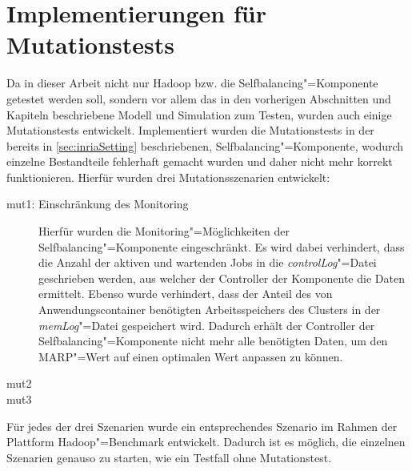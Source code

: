 \section{Implementierungen für Mutationstests}\label{sec:implMutationTests}

Da in dieser Arbeit nicht nur Hadoop bzw. die Selfbalancing"=Komponente getestet werden soll, sondern vor allem das in den vorherigen Abschnitten und Kapiteln beschriebene Modell und Simulation zum Testen, wurden auch einige Mutationstests entwickelt.
Implementiert wurden die Mutationstests in der bereits in \autoref{sec:inriaSetting} beschriebenen, Selfbalancing"=Komponente, wodurch einzelne Bestandteile fehlerhaft gemacht wurden und daher nicht mehr korrekt funktionieren.
Hierfür wurden drei Mutationsszenarien entwickelt:

\begin{description}
    \item [mut1: Einschränkung des Monitoring]
        Hierfür wurden die Monitoring"=Möglichkeiten der Selfbalancing"=Komponente eingeschränkt.
        Es wird dabei verhindert, dass die Anzahl der aktiven und wartenden Jobs in die \emph{controlLog}"=Datei geschrieben werden, aus welcher der Controller der Komponente die Daten ermittelt.
        Ebenso wurde verhindert, dass der Anteil des von Anwendungscontainer benötigten Arbeitsspeichers des Clusters in der \emph{memLog}"=Datei gespeichert wird.
        Dadurch erhält der Controller der Selfbalancing"=Komponente nicht mehr alle benötigten Daten, um den \ac{MARP}"=Wert auf einen optimalen Wert anpassen zu können.
    \item [mut2]
    \item [mut3]
\end{description}

Für jedes der drei Szenarien wurde ein entsprechendes Szenario im Rahmen der Plattform Hadoop"=Benchmark entwickelt.
Dadurch ist es möglich, die einzelnen Szenarien genauso zu starten, wie ein Testfall ohne Mutationstest.
